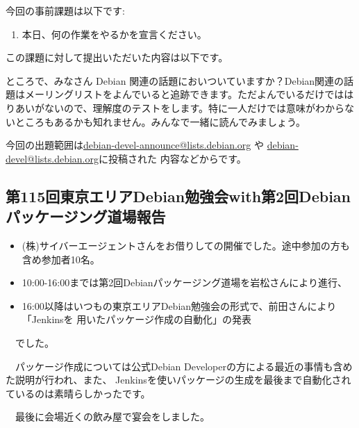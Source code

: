 \documentclass[mingoth,a4paper]{jsarticle}
\begin{document}

今回の事前課題は以下です:
\begin{enumerate}
 \item 本日、何の作業をやるかを宣言ください。
\end{enumerate}
この課題に対して提出いただいた内容は以下です。
\begin{multicols}{2}
{\small

}
\end{multicols}


ところで、みなさん Debian 関連の話題においついていますか？Debian関連の話
題はメーリングリストをよんでいると追跡できます。ただよんでいるだけではは
りあいがないので、理解度のテストをします。特に一人だけでは意味がわからな
いところもあるかも知れません。みんなで一緒に読んでみましょう。

今回の出題範囲は\url{debian-devel-announce@lists.debian.org} や \url{debian-devel@lists.debian.org}に投稿された
内容などからです。

\begin{multicols}{2}

\end{multicols}


\subsection{第115回東京エリアDebian勉強会with第2回Debianパッケージング道場報告}

\begin{itemize}
\item  (株)サイバーエージェントさんをお借りしての開催でした。途中参加の方も含め参加者10名。
\item 10:00-16:00までは第2回Debianパッケージング道場を岩松さんにより進行、
\item 16:00以降はいつもの東京エリアDebian勉強会の形式で、前田さんにより「Jenkinsを
用いたパッケージ作成の自動化」の発表
\end{itemize} 

　でした。

　パッケージ作成については公式Debian Developerの方による最近の事情も含めた説明が行われ、また、
Jenkinsを使いパッケージの生成を最後まで自動化されているのは素晴らしかったです。

　最後に会場近くの飲み屋で宴会をしました。
\end{document}
